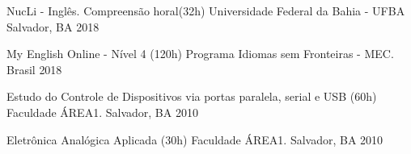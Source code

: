 

\begin{cvhonors}

  \cvhonor
    {NucLi - Inglês. Compreensão horal(32h)} %
    {Universidade Federal da Bahia - UFBA} %
    {Salvador, BA} %
    {2018} %
    
  \cvhonor
    {My English Online - Nível 4 (120h)} %
    {Programa Idiomas sem Fronteiras - MEC.} %
    {Brasil} %
    {2018} %

  \cvhonor
    {Estudo do Controle de Dispositivos via portas paralela, serial e USB (60h)} %
    {Faculdade ÁREA1.} %
    {Salvador, BA} %
    {2010} %

  \cvhonor
    {Eletrônica Analógica Aplicada (30h)} %
    {Faculdade ÁREA1.} %
    {Salvador, BA} %
    {2010} %

\end{cvhonors}
